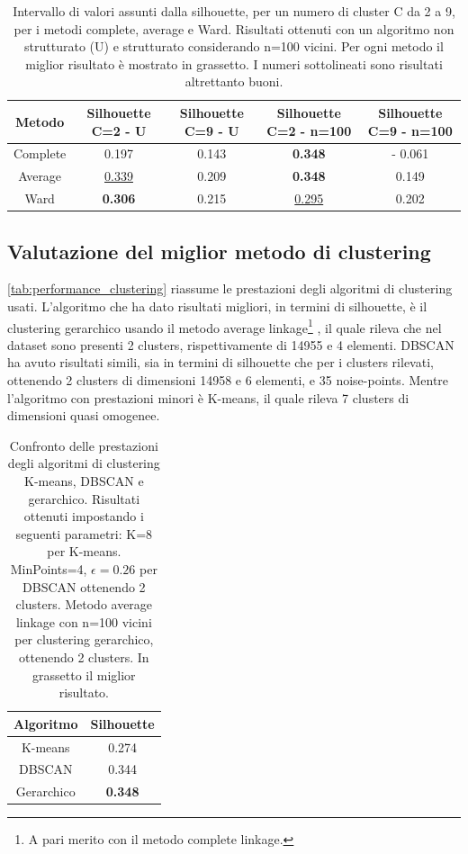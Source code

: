 \documentclass[10pt,a4paper,twocolumn]{article}
\begin{document}
\begin{table}
\caption{Intervallo di valori assunti dalla silhouette, per un numero di cluster C da 2 a 9, per i metodi complete, average e Ward. Risultati ottenuti con un algoritmo non strutturato (U) e strutturato considerando n=100 vicini. Per ogni metodo il miglior risultato è mostrato in grassetto. I numeri sottolineati sono risultati altrettanto buoni.}

\begin{tabular}{|c|c|c|c|c|}
\hline 
Metodo & Silhouette C=2 - U & Silhouette C=9 - U & Silhouette C=2 - n=100 & Silhouette C=9 - n=100 \\ 
\hline 
Complete & 0.197 & 0.143 & \textbf{0.348} & - 0.061 \\ 
\hline 
Average & \underline{0.339} & 0.209 & \textbf{0.348} & 0.149 \\ 
\hline 
Ward & \textbf{0.306} & 0.215 & \underline{0.295} & 0.202 \\ 
\hline 
\end{tabular}
\label{tab:hierarchical_silhouette}
\end{table}

\subsection{Valutazione del miglior metodo di clustering}
\autoref{tab:performance_clustering} riassume le prestazioni degli algoritmi di clustering usati. L'algoritmo che ha dato risultati migliori, in termini di silhouette, è il clustering gerarchico usando il metodo average linkage\footnote{A pari merito con il metodo complete linkage.} , il quale rileva che nel dataset sono presenti 2 clusters, rispettivamente di 14955 e 4 elementi. DBSCAN ha avuto risultati simili, sia in termini di silhouette che per i clusters rilevati, ottenendo 2 clusters di dimensioni 14958 e 6 elementi, e 35 noise-points. Mentre l'algoritmo con prestazioni minori è K-means, il quale rileva 7 clusters di dimensioni quasi omogenee. 

\begin{table}
\caption{Confronto delle prestazioni degli algoritmi di clustering K-means, DBSCAN e gerarchico. Risultati ottenuti impostando i seguenti parametri: K=8 per K-means. MinPoints=4, $\epsilon=0.26$ per DBSCAN ottenendo 2 clusters. Metodo average linkage con n=100 vicini per clustering gerarchico, ottenendo 2 clusters. In grassetto il miglior risultato.}

\begin{tabular}{c|c}
Algoritmo & Silhouette \\
\hline 
K-means & 0.274 \\ 
DBSCAN & 0.344 \\ 
Gerarchico & \textbf{0.348} \\ 
\hline 
\end{tabular} 
\label{tab:performance_clustering}
\end{table}
\end{document}
